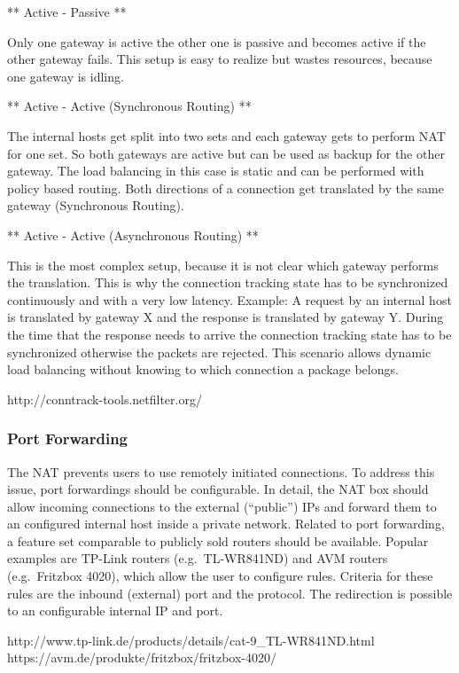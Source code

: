 ** Active - Passive **

Only one gateway is active the other one is passive and becomes active
if the other gateway fails. This setup is easy to realize but wastes
resources, because one gateway is idling.

** Active - Active (Synchronous Routing) **

The internal hosts get split into two sets and each gateway gets to
perform NAT for one set. So both gateways are active but can be used as
backup for the other gateway. The load balancing in this case is static
and can be performed with policy based routing. Both directions of a
connection get translated by the same gateway (Synchronous Routing).

** Active - Active (Asynchronous Routing) **

This is the most complex setup, because it is not clear which gateway
performs the translation. This is why the connection tracking state has
to be synchronized continuously and with a very low latency. Example: A
request by an internal host is translated by gateway X and the response
is translated by gateway Y. During the time that the response needs to
arrive the connection tracking state has to be synchronized otherwise
the packets are rejected. This scenario allows dynamic load balancing
without knowing to which connection a package belongs.

http://conntrack-tools.netfilter.org/

\subsubsection{Port Forwarding}\label{port-forwarding}

The NAT prevents users to use remotely initiated connections. To address
this issue, port forwardings should be configurable. In detail, the NAT
box should allow incoming connections to the external (``public'') IPs
and forward them to an configured internal host inside a private
network. Related to port forwarding, a feature set comparable to
publicly sold routers should be available. Popular examples are TP-Link
routers (e.g.~TL-WR841ND) and AVM routers (e.g.~Fritzbox 4020), which
allow the user to configure rules. Criteria for these rules are the
inbound (external) port and the protocol. The redirection is possible to
an configurable internal IP and port.

http://www.tp-link.de/products/details/cat-9\_TL-WR841ND.html
https://avm.de/produkte/fritzbox/fritzbox-4020/

